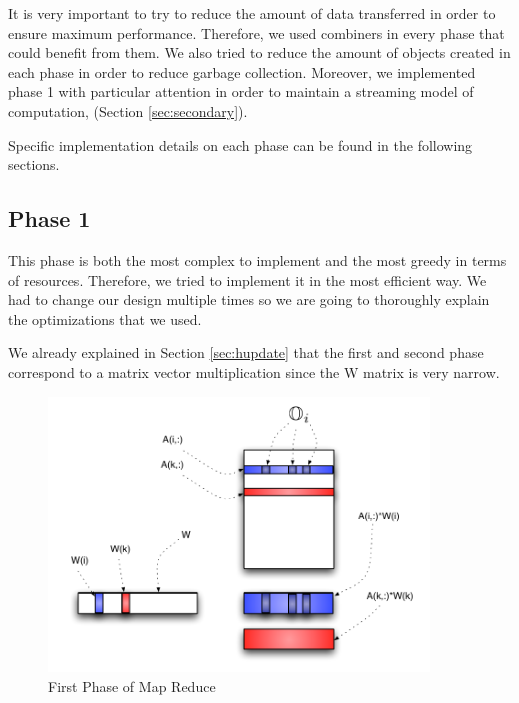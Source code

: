 \documentclass[a4paper,12pt]{article}
\begin{document}
It is very important to try to reduce the amount of data transferred in order to ensure maximum performance.
Therefore, we used combiners in every phase that could benefit from them.
We also tried to reduce the amount of objects created in each phase in order to reduce garbage collection.
Moreover, we implemented phase 1 with particular attention in order to maintain a streaming model of computation,  (Section \ref{sec:secondary}).

Specific implementation details on each phase can be found in the following sections.

\subsection{Phase 1}
\label{sec:phase1}

This phase is both the most complex to implement and the most greedy in terms of resources.
Therefore, we tried to implement it in the most efficient way.
We had to change our design multiple times so we are going to thoroughly explain the optimizations that we used.

We already explained in Section \ref{sec:hupdate} that the first and second phase correspond to a matrix vector multiplication since the W matrix is very narrow.

\begin{center}
	\begin{figure}[h]
	\centering
	\includegraphics[width=0.9\textwidth]{./figures/Map1}
	\caption{First Phase of Map Reduce}
	\label{fig:Map1}
	\end{figure}
\end{center}
\end{document}
